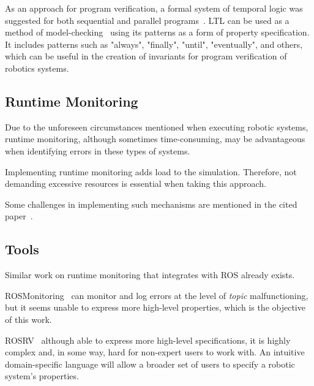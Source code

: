 As an approach for program verification, a formal system of temporal logic was suggested for both sequential and parallel programs~\cite{pnueli1977temporal}. LTL can be used as a method of model-checking~\cite{dwyer1998property} using its patterns as a form of property specification. It includes patterns such as "always", "finally", "until", "eventually", and others, which can be useful in the creation of invariants for program verification of robotics systems.


\subsection{Runtime Monitoring}

Due to the unforeseen circumstances mentioned when executing robotic systems, runtime monitoring, although sometimes time-consuming, may be advantageous when identifying errors in these types of systems.

Implementing runtime monitoring adds load to the simulation. Therefore, not demanding excessive resources is essential when taking this approach.

Some challenges in implementing such mechanisms are mentioned in the cited paper~\cite{stadler2022towards}.

\subsection{Tools}

Similar work on runtime monitoring that integrates with ROS already exists. 

ROSMonitoring~\cite{ferrando2020rosmonitoring} can monitor and log errors at the level of \textit{topic} malfunctioning, but it seems unable to express more high-level properties, which is the objective of this work. 

ROSRV~\cite{huang2014rosrv} although able to express more high-level specifications, it is highly complex and, in some way, hard for non-expert users to work with. An intuitive domain-specific language will allow a broader set of users to specify a robotic system's properties. 

